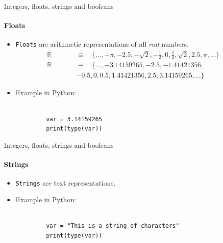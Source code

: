 \documentclass[notes,11pt, aspectratio=169, xcolor=table]{beamer}
\begin{document}
    \begin{frame}[fragile=singleslide]{Integers, floats, strings and booleans}
    \framesubtitle{Floats}

        \begin{itemize}
            \item \texttt{Floats} are arithmetic representations of all \textit{real} numbers.
            \begin{eqnarray}
                \mathbb{R} &\quad& \equiv \quad \{ \hdots, -\pi, -2.5, -\sqrt{2}, -\frac{1}{2}, 0, \frac{1}{2}, \sqrt{2}, 2.5, \pi, \hdots \} \\ \nonumber
                \mathbb{R} &\quad& \equiv \quad \{ \hdots, -3.14159265, -2.5, -1.41421356, \\ \nonumber
                &\qquad& -0.5, 0, 0.5, 1.41421356, 2.5, 3.14159265, \hdots \}
            \end{eqnarray}
            \item Example in Python:
        \end{itemize}

        \begin{verbatim}
        
            var = 3.14159265
            print(type(var))
        \end{verbatim}    
   

    \end{frame}    

    \begin{frame}[fragile=singleslide]{Integers, floats, strings and booleans}
    \framesubtitle{Strings}

        \begin{itemize}
            \item \texttt{Strings} are text representations.
            \item Example in Python:
        \end{itemize}

        \begin{verbatim}
        
            var = "This is a string of characters"
            print(type(var))
        \end{verbatim}    
   

    \end{frame}    
\end{document}
